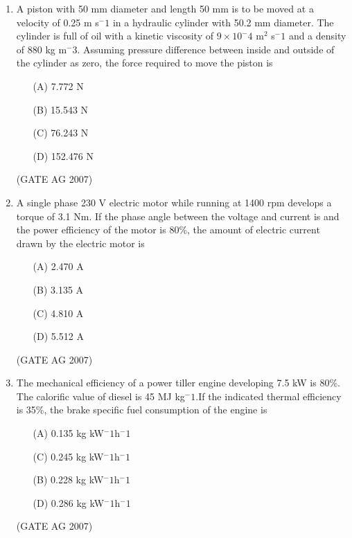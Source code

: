 \documentclass[journal,12pt,onecolumn]{IEEEtran}
\theoremstyle{remark}
\begin{document}
\begin{enumerate}[label=Q\arabic*:]
\item  A piston with 50 mm diameter and length 50 mm is to be moved at a velocity of 0.25 m s$^-1$ in a hydraulic cylinder with 50.2 mm diameter. The cylinder is full of oil with a kinetic viscosity of $9 \times 10^-4$ m$^2$ s$^-1$ and a density of 880 kg m$^-3$. Assuming pressure difference between inside and outside of the cylinder as zero, the force required to move the piston is 
\begin{multicols}{4}
\begin{enumerate}
    \item [(A)] 7.772 N
    \item [(B)] 15.543 N
    \item [(C)] 76.243 N
    \item [(D)] 152.476 N
\end{enumerate}
\end{multicols}
\hfill(GATE AG 2007)

\item  A single phase 230 V electric motor while running at 1400 rpm develops a torque of 3.1 Nm. If the phase angle between the voltage and current is            and the power efficiency of the motor is 80\%, the amount of electric current drawn by the electric motor is
\begin{multicols}{4}
 \begin{enumerate}
     \item [(A)] 2.470 A
     \item [(B)] 3.135 A
     \item [(C)] 4.810 A
     \item [(D)] 5.512 A
 \end{enumerate}   
\end{multicols}
\hfill(GATE AG 2007)

\item  The mechanical efficiency of a power tiller engine developing 7.5 kW is 80\%. The calorific value of diesel is 45 MJ kg$^-1$.If the indicated thermal efficiency is 35\%, the brake specific fuel consumption of the engine is 
\begin{multicols}{2}
    \begin{enumerate}
        \item [(A)] 0.135 kg kW$^-1$h$^-1$ 
        \item [(C)] 0.245  kg kW$^-1$h$^-1$ 
        \item [(B)] 0.228  kg kW$^-1$h$^-1$ 
        \item [(D)] 0.286  kg kW$^-1$h$^-1$ 
    \end{enumerate}
\end{multicols}
\hfill(GATE AG 2007)


\end{enumerate}
\end{document}

